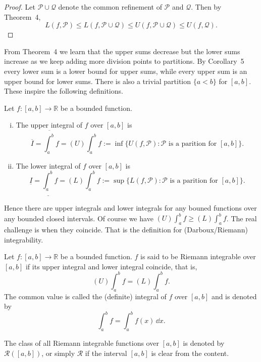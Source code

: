 \begin{proof}
  Let $\mathcal{P} \cup \mathcal{Q}$ denote the common refinement of $\mathcal{P}$ and $\mathcal{Q}$.  Then by Theorem~4,
  \[
    L(f,\mathcal{P}) \leqslant L(f, \mathcal{P} \cup \mathcal{Q}) \leqslant U(f, \mathcal{P} \cup \mathcal{Q}) \leqslant U(f, \mathcal{Q}).
  \]
\end{proof}

From Theorem~4 we learn that the upper sums decrease but the lower sums increase as we keep adding more division points to partitions.
By Corollary~5 every lower sum is a lower bound for upper sums, while every upper sum is an upper bound for lower sums.
There is also a trivial partition $\{ a < b \}$ for $[a,b]$.
These inspire the following definitions.

\begin{defn}
  Let $f : [a,b] \to \mathbb{R}$ be a bounded function.

  \begin{enumerate}[(i)]
    \item The \textsf{upper integral} of $f$ over $[a,b]$ is
      \[
	\overline{I} = \overline{\int_a^b} f = (U) \int_a^b f := 
	\inf \{ U(f,\mathcal{P}) \colon \mathcal{P} \text{ is a parition for $[a,b]$} \}.
      \]

    \item The \textsf{lower integral} of $f$ over $[a,b]$ is
      \[
	\underline{I} = \underline{\int_a^b} f = (L) \int_a^b f := 
	\sup \{ L(f,\mathcal{P}) \colon \mathcal{P} \text{ is a parition for $[a,b]$} \}.
      \]
  \end{enumerate}
\end{defn}

Hence there are upper integrals and lower integrals for any bouned functions over any bounded closed intervals.
Of course we have $\displaystyle (U) \int_a^b f \geqslant (L) \int_a^b f$. 
The real challenge is when they coincide.
That is the definition for (Darboux/Riemann) integrability.

\begin{defn}
  Let $f : [a,b] \to \mathbb{R}$ be a bounded function.
  $f$ is said to be \textsf{Riemann integrable} over $[a,b]$ if its upper integral and lower integral coincide, that is,
  \[
    (U) \int_a^b f = (L) \int_a^b f.
  \]
  The common value is called the \textsf{(definite) integral} of $f$ over $[a,b]$ and is denoted by
  \[
    \int_a^b f = \int_a^b f(x) \, \dd x.
  \]

  The class of all Riemann integrable functions over $[a,b]$ is denoted by $\mathcal{R}([a,b])$, or simply $\mathcal{R}$ if the interval $[a,b]$ is clear from the content.
\end{defn}

